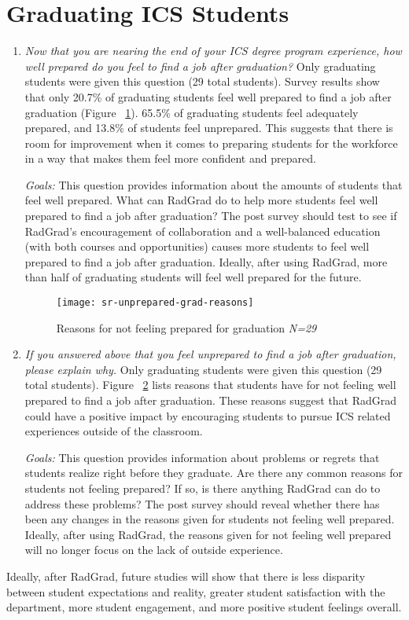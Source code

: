 \section{Graduating ICS Students}
\begin{enumerate}
\begin{figure}[h]
\centering
\texttt{[image: sr-prepared]}
\caption{Results for graduation preparedness \textit{N=29}}
\label{prepared-grad}
\end{figure}
\item \textit{Now that you are nearing the end of your ICS degree program experience, how well prepared do you feel to find a job after graduation?}
Only graduating students were given this question (29 total students). Survey results show that only 20.7\% of graduating students feel well prepared to find a job after graduation (Figure ~\ref{prepared-grad}). 65.5\% of graduating students feel adequately prepared, and 13.8\% of students feel unprepared. This suggests that there is room for improvement when it comes to preparing students for the workforce in a way that makes them feel more confident and prepared. 

\textit{Goals:} This question provides information about the amounts of students that feel well prepared. What can RadGrad do to help more students feel well prepared to find a job after graduation? The post survey should test to see if RadGrad's encouragement of collaboration and a well-balanced education (with both courses and opportunities) causes more students to feel well prepared to find a job after graduation. Ideally, after using RadGrad, more than half of graduating students will feel well prepared for the future.

\begin{figure}[h]
\centering
\texttt{[image: sr-unprepared-grad-reasons]}
\caption{Reasons for not feeling prepared for graduation \textit{N=29}}
\label{reasons}
\end{figure}
\item \textit{If you answered above that you feel unprepared to find a job after graduation, please explain why. }
Only graduating students were given this question (29 total students). Figure ~\ref{reasons} lists reasons that students have for not feeling well prepared to find a job after graduation. These reasons suggest that RadGrad could have a positive impact by encouraging students to pursue ICS related experiences outside of the classroom.

\textit{Goals:} This question provides information about problems or regrets that students realize right before they graduate. Are there any common reasons for students not feeling prepared? If so, is there anything RadGrad can do to address these problems? The post survey should reveal whether there has been any changes in the reasons given for students not feeling well prepared. Ideally, after using RadGrad, the reasons given for not feeling well prepared will no longer focus on the lack of outside experience. 

\end{enumerate}

Ideally, after RadGrad, future studies will show that there is less disparity between student expectations and reality, greater student satisfaction with the department, more student engagement, and more positive student feelings overall.


